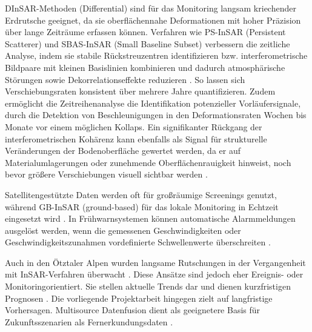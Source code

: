 \documentclass[../main.tex]{subfiles}
\begin{document}
DInSAR-Methoden (Differential) sind für das Monitoring langsam kriechender Erdrutsche geeignet, da sie oberflächennahe Deformationen mit hoher Präzision über lange Zeiträume erfassen können. Verfahren wie PS-InSAR (Persistent Scatterer) und SBAS-InSAR (Small Baseline Subset) verbessern die zeitliche Analyse, indem sie stabile Rückstreuzentren identifizieren bzw. interferometrische Bildpaare mit kleinen Basislinien kombinieren und dadurch atmosphärische Störungen sowie Dekorrelationseffekte reduzieren \autocite{kaabRemoteSensingGlacier2005, scaioniRemoteSensingLandslide2014, strzabalaIdentificationLandslidePrecursors2024}. So lassen sich Verschiebungsraten konsistent über mehrere Jahre quantifizieren. Zudem ermöglicht die Zeitreihenanalyse die Identifikation potenzieller Vorläufersignale, durch die Detektion von Beschleunigungen in den Deformationsraten Wochen bis Monate vor einem möglichen Kollaps. Ein signifikanter Rückgang der interferometrischen Kohärenz kann ebenfalls als Signal für strukturelle Veränderungen der Bodenoberfläche gewertet werden, da er auf Materialumlagerungen oder zunehmende Oberflächenrauigkeit hinweist, noch bevor größere Verschiebungen visuell sichtbar werden \autocite{scaioniRemoteSensingLandslide2014, strzabalaIdentificationLandslidePrecursors2024}.

Satellitengestützte Daten werden oft für großräumige Screenings genutzt, während GB-InSAR (ground-based) für das lokale Monitoring in Echtzeit eingesetzt wird \autocite{vanwykdevriesDetectionSlowmovingLandslides2024, scaioniRemoteSensingLandslide2014, strzabalaIdentificationLandslidePrecursors2024}. In Frühwarnsystemen können automatische Alarmmeldungen ausgelöst werden, wenn die gemessenen Geschwindigkeiten oder Geschwindigkeitszunahmen vordefinierte Schwellenwerte überschreiten \autocite{scaioniRemoteSensingLandslide2014, strzabalaIdentificationLandslidePrecursors2024}.

Auch in den Ötztaler Alpen wurden langsame Rutschungen in der Vergangenheit mit InSAR-Verfahren überwacht \autocite{pragerGeologicalControlsSlope2009, kaabRemoteSensingGlacier2005}. Diese Ansätze sind jedoch eher Ereignis- oder Monitoringorientiert. Sie stellen aktuelle Trends dar und dienen kurzfristigen Prognosen \autocite{kaabRemoteSensingGlacier2005, strzabalaIdentificationLandslidePrecursors2024}. Die vorliegende Projektarbeit hingegen zielt auf langfristige Vorhersagen. Multisource Datenfusion dient als geeignetere Basis für Zukunftsszenarien als Fernerkundungsdaten \autocite{woodLandslideInventoriesClimate2015, jinAccurateLandslideIdentification2022, kaabRemoteSensingGlacier2005, strzabalaIdentificationLandslidePrecursors2024}.
\end{document}
